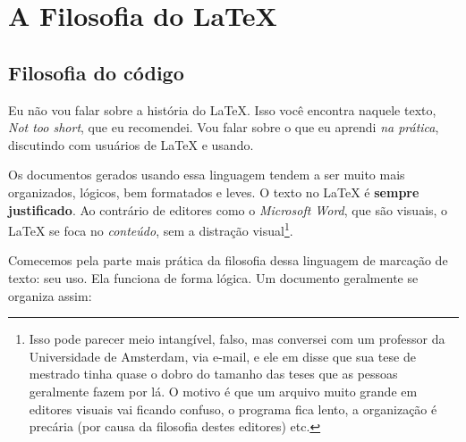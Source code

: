 \chapter{A Filosofia do \LaTeX{}}

\section{Filosofia do código}

Eu não vou falar sobre a história do \LaTeX{}. Isso você encontra naquele texto, \emph{Not too short}, que eu recomendei. Vou falar sobre o que eu aprendi \emph{na prática}, discutindo com usuários de \LaTeX{} e usando.

Os documentos gerados usando essa linguagem tendem a ser muito mais organizados, lógicos, bem formatados e leves. O texto no \LaTeX{} é \textbf{sempre justificado}. Ao contrário de editores como o \emph{Microsoft Word}, que são visuais, o \LaTeX{} se foca no \emph{conteúdo}, sem a distração visual\footnote{Isso pode parecer meio intangível, falso, mas conversei com um professor da Universidade de Amsterdam, via e-mail, e ele em disse que sua tese de mestrado tinha quase o dobro do tamanho das teses que as pessoas geralmente fazem por lá. O motivo é que um arquivo muito grande em editores visuais vai ficando confuso, o programa fica lento, a organização é precária (por causa da filosofia destes editores) etc.}.

Comecemos pela parte mais prática da filosofia dessa linguagem de marcação de texto: seu uso. Ela funciona de forma lógica. Um documento geralmente se organiza assim:


